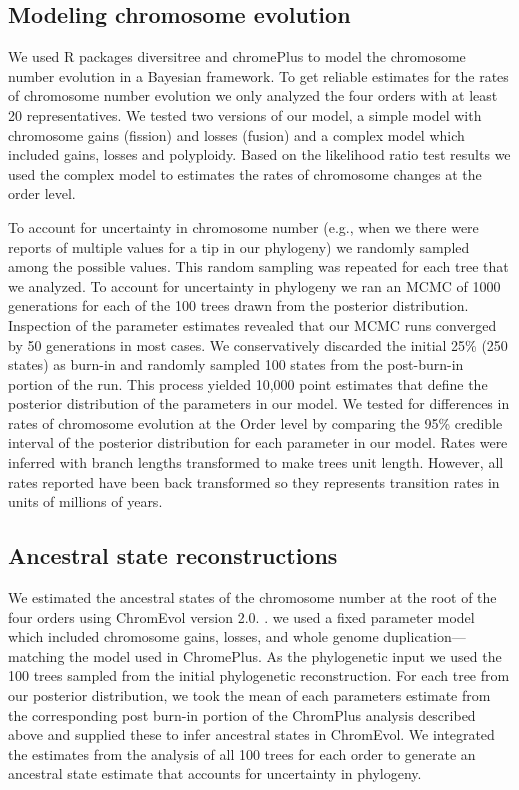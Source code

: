 \subsection{Modeling chromosome evolution}
We used R packages diversitree \citep{fitzjohn2012} and chromePlus \citep{blackmon2019meiotic} to model the chromosome number evolution in a Bayesian framework.
To get reliable estimates for the rates of chromosome number evolution we only analyzed the four orders with at least 20 representatives.
We tested two versions of our model, a simple model with chromosome gains (fission) and losses (fusion) and a complex model which included gains, losses and polyploidy.
Based on the likelihood ratio test results we used the complex model to estimates the rates of chromosome changes at the order level.

To account for uncertainty in chromosome number (e.g., when we there were reports of multiple values for a tip in our phylogeny) we randomly sampled among the possible values.
This random sampling was repeated for each tree that we analyzed.
To account for uncertainty in phylogeny we ran an MCMC of 1000 generations for each of the 100 trees drawn from the posterior distribution.
Inspection of the parameter estimates revealed that our MCMC runs converged by 50 generations in most cases.  
We conservatively discarded the initial 25\% (250 states) as burn-in and randomly sampled 100 states from the post-burn-in portion of the run. 
This process yielded 10,000 point estimates that define the posterior distribution of the parameters in our model.
We tested for differences in rates of chromosome evolution at the Order level by comparing the 95\% credible interval of the posterior distribution for each parameter in our model.
Rates were inferred with branch lengths transformed to make trees unit length.
However, all rates reported have been back transformed so they represents transition rates in units of millions of years.

\subsection{Ancestral state reconstructions}
We estimated the ancestral states of the chromosome number at the root of the four orders using ChromEvol version 2.0. \citep{glick2014chromevol, mayrose2009chromevol}.
we used a fixed parameter model which included chromosome gains, losses, and whole genome duplication---matching the model used in ChromePlus.
As the phylogenetic input we used the 100 trees sampled from the initial phylogenetic reconstruction. 
For each tree from our posterior distribution, we took the mean of each parameters estimate from the corresponding post burn-in portion of the ChromPlus analysis described above and supplied these to infer ancestral states in ChromEvol.
We integrated the estimates from the analysis of all 100 trees for each order to generate an ancestral state estimate that accounts for uncertainty in phylogeny. 


